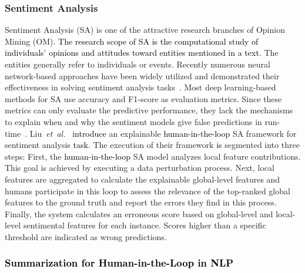\documentclass{article}
\newcommand\etal{\emph{et~al.}}
\newcommand{\REO}[1]{\textcolor{black}{#1}}
\newcommand{\ZJH}[1]{\textcolor{black}{#1}}
\begin{document}
\subsubsection{Sentiment Analysis}

Sentiment Analysis (SA) is one of the attractive research branches of Opinion Mining (OM). \ZJH{The research scope of SA is the computational study of individuals' opinions and attitudes toward entities mentioned in a text}. The entities generally refer to individuals or events. Recently numerous neural network-based approaches have been widely utilized and demonstrated their effectiveness in solving sentiment analysis tasks~\cite{song2019targeted, xiao2020targeted, xiao2020multi}. Most deep learning-based methods for SA use accuracy and F1-score as evaluation metrics. Since these metrics can only evaluate the predictive performance, they lack the mechanisms to explain when and why the sentiment models give false predictions in run-time~\cite{nushi2018towards}. Liu~\etal~\cite{liu2021and} \ZJH{introduce} an explainable \REO{human-in-the-loop} SA framework for sentiment analysis \ZJH{task}. The execution of their framework \ZJH{is} segmented into three steps: First, the \REO{human-in-the-loop} SA model analyzes local feature contributions. This goal is achieved by executing a data perturbation process. Next, local features are aggregated to calculate the explainable global-level features and humans participate in this loop to assess the relevance of the top-ranked global features to the ground truth and report the errors they find in this process. Finally, the system calculates an erroneous score based on global-level and local-level sentimental features for each instance. Scores higher than a specific threshold are indicated as wrong predictions.



\REO{\subsubsection{Summarization for Human-in-the-Loop in NLP}}
\end{document}
